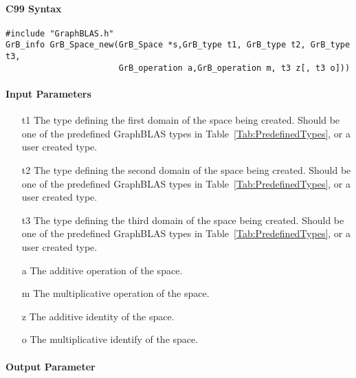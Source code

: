 \documentclass[11pt]{extarticle}
\begin{document}
\paragraph{C99 Syntax}

\begin{verbatim}
#include "GraphBLAS.h"
GrB_info GrB_Space_new(GrB_Space *s,GrB_type t1, GrB_type t2, GrB_type t3,
                       GrB_operation a,GrB_operation m, t3 z[, t3 o]))
\end{verbatim}


\paragraph{Input Parameters}

\begin{itemize}
	\item[{\sf t1}] The type defining the first domain of the space being created. Should be one of the predefined
	GraphBLAS types in Table~\ref{Tab:PredefinedTypes}, or a user created type.
	\item[{\sf t2}] The type defining the second domain of the space being created. Should be one of the predefined
	GraphBLAS types in Table~\ref{Tab:PredefinedTypes}, or a user created type.
	\item[{\sf t3}] The type defining the third domain of the space being created. Should be one of the predefined
	GraphBLAS types in Table~\ref{Tab:PredefinedTypes}, or a user created type.
	\item[{\sf a}] The additive operation of the space.
	\item[{\sf m}] The multiplicative operation of the space.
	\item[{\sf z}] The additive identity of the space.
	\item[{\sf o}] The multiplicative identify of the space.
\end{itemize}

\paragraph{Output Parameter}
\end{document}
